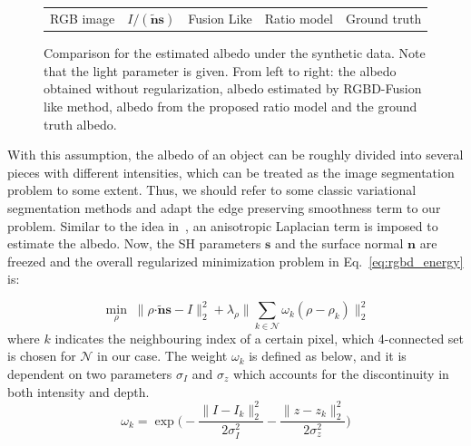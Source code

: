 \begin{figure}[!ht]
{\begin{tabular}{c|c c c c}
 \\
   {RGB image} & {$I/(\tilde{\mathbf{n}}\mathbf{s})$} & {Fusion Like} &{Ratio model} &{Ground truth}                 
 \end{tabular}}
\caption{Comparison for the estimated albedo under the synthetic data. Note that the light parameter is given. From left to right: the albedo obtained without regularization, albedo estimated by RGBD-Fusion like method, albedo from the proposed ratio model and the ground truth albedo.}
\label{fig:rgbd_rho_illu}
\end{figure}


With this assumption, the albedo of an object can be roughly divided into several pieces with different intensities, which can be treated as the image segmentation problem to some extent. 
Thus, we should refer to some classic variational segmentation methods and adapt the edge preserving smoothness term to our problem.
Similar to the idea in~\cite{casaca2014laplacian}, an anisotropic Laplacian term is imposed to estimate the albedo.
Now, the SH parameters $\mathbf{s}$ and the surface normal $\mathbf{n}$ are freezed and the overall regularized minimization problem in Eq.~\ref{eq:rgbd_energy} is:

\begin{equation}\label{eq:rgbd_albedo_estimate}
    \min_{\rho} \; \lVert \rho \boldsymbol{\cdot} \tilde{\mathbf{n}} \mathbf{s} - I\rVert^2_2 + \lambda_{\rho} \lVert \sum_{k \in \mathcal{N}} \omega_k (\rho - \rho_k) \rVert^2_2
\end{equation}
where $k$ indicates the neighbouring index of a certain pixel, which 4-connected set is chosen for $\mathcal{N}$ in our case. 
The weight $\omega_k$ is defined as below, and it is dependent on two parameters $\sigma_I$ and $\sigma_z$ which accounts for the discontinuity in both intensity and depth.
\begin{equation}
    \omega_k=\exp\Bigg(-\dfrac{\lVert I - I_k \rVert^2_2}{2\sigma_I^2} -\dfrac{\lVert z - z_k \rVert^2_2}{2\sigma_z^2}\Bigg)
\end{equation}

